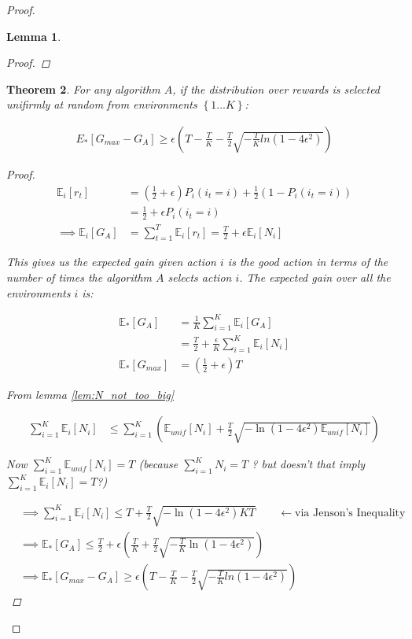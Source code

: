 \documentclass{article}
\newcommand{\E}{\mathbb E}
\newcommand{\set}[1]{\left\{#1\right\}}
\newcommand{\eqn}[1]{\begin{align}#1\end{align}}
\renewcommand{\Pi}[1]{P_i\left( #1 \right)}
\newcommand{\Ei}[1]{\E_i\left[ #1 \right]}
\newcommand{\Eu}[1]{\E_{unif}\left[ #1 \right]}
\newcommand{\Es}[1]{\E_{*}\left[ #1 \right]}
\theoremstyle{plain}
\newtheorem{theorem}{Theorem}
\newtheorem{lemma}[theorem]{Lemma}
\theoremstyle{definition}
\begin{document}
\begin{proof}
\begin{lemma}
\begin{proof}
\end{proof}
\end{lemma}

\begin{theorem}
For any algorithm $A$, if the distribution over rewards is selected unifirmly at random from environments $\set{1...K}$:

\eqn {
E_*[G_{max} - G_A] \geq \epsilon\left(T - \frac{T}{K} - \frac{T}{2}\sqrt{-\frac{T}{K}ln(1-4\epsilon^2)}  \right) 
}

\begin{proof}

\eqn{
\Ei{r_t} &= \left(\frac{1}{2}+\epsilon \right)\Pi{i_t = i} + \frac{1}{2}\left(1-\Pi{i_t = i} \right) \\
& = \frac{1}{2} + \epsilon \Pi{i_t = i}\\
\implies \Ei{G_A} &= \sum_{t=1}^T \Ei{r_t} = \frac{T}{2}+\epsilon \Ei{N_i}
}

This gives us the expected gain given action $i$ is the good action in terms of the number of times the algorithm $A$ selects action $i$. The expected gain over all the environments $i$ is:

\eqn{
\Es{G_A} &= \frac{1}{K}\sum_{i=1}^K \Ei{G_A} \\
&= \frac{T}{2} + \frac{\epsilon}{K}\sum_{i=1}^K \Ei{N_i}\\
\Es{G_{max}} &= \left(\frac{1}{2}+\epsilon \right)T
}

From lemma \ref{lem:N_not_too_big}

\eqn{
\sum_{i=1}^K\Ei{N_i} & \leq \sum_{i=1}^K \left(\Eu{N_i}+ \frac{T}{2}\sqrt{-\ln({1-4\epsilon^2})\Eu{N_i}}\right)
}

Now $\sum_{i=1}^K\Eu{N_i} = T$ (because $\sum_{i=1}^K N_i = T$ ? but doesn't that imply $\sum_{i=1}^K\Ei{N_i} = T$?)

\eqn{
&\implies \sum_{i=1}^K\Ei{N_i} \leq T+ \frac{T}{2} \sqrt{-\ln(1-4\epsilon^2)KT} \qquad \leftarrow \text{via Jenson's Inequality} \\
&\implies \Es{G_A} \leq \frac{T}{2} + \epsilon\left(\frac{T}{K}+ \frac{T}{2} \sqrt{-\frac{T}{K}\ln(1-4\epsilon^2)} \right) \\ 
&\implies \Es{G_{max} - G_A} \geq \epsilon\left(T - \frac{T}{K} - \frac{T}{2}\sqrt{-\frac{T}{K}ln(1-4\epsilon^2)}  \right) 
}

\end{proof}



\end{theorem}


\end{proof}
\end{document}
